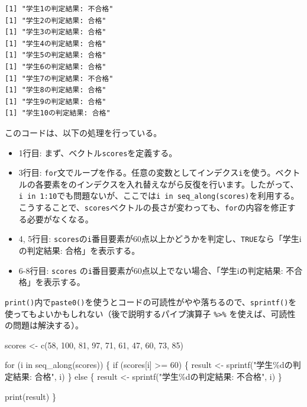 \documentclass[
  a4paper,
  pandoc,
  ja=standard,
  jafont=haranoaji]{bxjsbook}
\newenvironment{Shaded}{\begin{snugshade}}{\end{snugshade}}
\newcommand{\ControlFlowTok}[1]{\textcolor[rgb]{0.00,0.48,0.65}{#1}}
\newcommand{\DecValTok}[1]{\textcolor[rgb]{0.68,0.00,0.00}{#1}}
\newcommand{\FunctionTok}[1]{\textcolor[rgb]{0.28,0.35,0.67}{#1}}
\newcommand{\NormalTok}[1]{\textcolor[rgb]{0.00,0.48,0.65}{#1}}
\newcommand{\OtherTok}[1]{\textcolor[rgb]{0.00,0.48,0.65}{#1}}
\newcommand{\SpecialCharTok}[1]{\textcolor[rgb]{0.37,0.37,0.37}{#1}}
\newcommand{\StringTok}[1]{\textcolor[rgb]{0.13,0.47,0.30}{#1}}
\providecommand{\tightlist}{%
  \setlength{\itemsep}{0pt}\setlength{\parskip}{0pt}}
\begin{document}
\begin{verbatim}
[1] "学生1の判定結果: 不合格"
[1] "学生2の判定結果: 合格"
[1] "学生3の判定結果: 合格"
[1] "学生4の判定結果: 合格"
[1] "学生5の判定結果: 合格"
[1] "学生6の判定結果: 合格"
[1] "学生7の判定結果: 不合格"
[1] "学生8の判定結果: 合格"
[1] "学生9の判定結果: 合格"
[1] "学生10の判定結果: 合格"
\end{verbatim}

このコードは、以下の処理を行っている。

\begin{itemize}
\tightlist
\item
  1行目: まず、ベクトル\texttt{scores}を定義する。
\item
  3行目:
  \texttt{for}文でループを作る。任意の変数としてインデクス\texttt{i}を使う。ベクトルの各要素をのインデクスを入れ替えながら反復を行います。したがって、\texttt{i\ in\ 1:10}でも問題ないが、ここでは\texttt{i\ in\ seq\_along(scores)}を利用する。こうすることで、\texttt{scores}ベクトルの長さが変わっても、\texttt{for}の内容を修正する必要がなくなる。
\item
  4, 5行目:
  \texttt{scores}の\texttt{i}番目要素が60点以上かどうかを判定し、\texttt{TRUE}なら「学生iの判定結果:
  合格」を表示する。
\item
  6-8行目: \texttt{scores}
  の\texttt{i}番目要素が60点以上でない場合、「学生iの判定結果:
  不合格」を表示する。
\end{itemize}

\texttt{print()}内で\texttt{paste0()}を使うとコードの可読性がやや落ちるので、\texttt{sprintf()}を使ってもよいかもしれない（後で説明するパイプ演算子
\texttt{\%\textgreater{}\%} を使えば、可読性の問題は解決する）。

\begin{Shaded}
\begin{Highlighting}[numbers=left,,]
\NormalTok{scores }\OtherTok{\textless{}{-}} \FunctionTok{c}\NormalTok{(}\DecValTok{58}\NormalTok{, }\DecValTok{100}\NormalTok{, }\DecValTok{81}\NormalTok{, }\DecValTok{97}\NormalTok{, }\DecValTok{71}\NormalTok{, }\DecValTok{61}\NormalTok{, }\DecValTok{47}\NormalTok{, }\DecValTok{60}\NormalTok{, }\DecValTok{73}\NormalTok{, }\DecValTok{85}\NormalTok{)}

\ControlFlowTok{for}\NormalTok{ (i }\ControlFlowTok{in} \FunctionTok{seq\_along}\NormalTok{(scores)) \{}
  \ControlFlowTok{if}\NormalTok{ (scores[i] }\SpecialCharTok{\textgreater{}=} \DecValTok{60}\NormalTok{) \{}
\NormalTok{    result }\OtherTok{\textless{}{-}} \FunctionTok{sprintf}\NormalTok{(}\StringTok{"学生\%dの判定結果: 合格"}\NormalTok{, i)}
\NormalTok{  \} }\ControlFlowTok{else}\NormalTok{ \{}
\NormalTok{    result }\OtherTok{\textless{}{-}} \FunctionTok{sprintf}\NormalTok{(}\StringTok{"学生\%dの判定結果: 不合格"}\NormalTok{, i)}
\NormalTok{  \}}
  
  \FunctionTok{print}\NormalTok{(result)}
\NormalTok{\}}
\end{Highlighting}
\end{Shaded}
\end{document}
